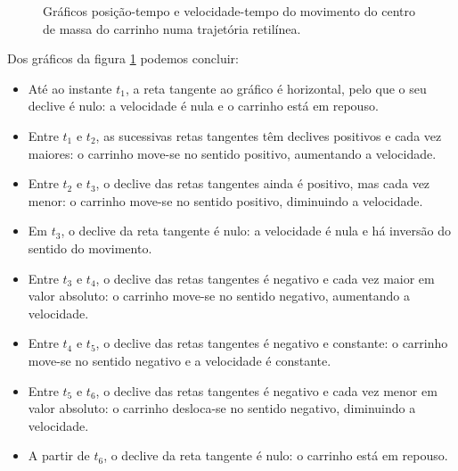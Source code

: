 \documentclass[a4paper,12pt]{article}
\begin{document}
\begin{figure}[H]
		\caption{Gráficos posição-tempo e velocidade-tempo do movimento do centro de massa do carrinho numa trajetória retilínea.}
		\label{fig:grafv1}
	\end{figure}
	
	Dos gráficos da figura \ref{fig:grafv1} podemos concluir:
	\begin{itemize}
		\item Até ao instante $t_1$, a reta tangente ao gráfico é horizontal, pelo que o seu declive é nulo: a velocidade é nula e o carrinho está em repouso.
		\item Entre $t_1$ e $t_2$, as sucessivas retas tangentes têm declives positivos e cada vez maiores: o carrinho move-se no sentido positivo, aumentando a  velocidade.
		\item Entre $t_2$ e $t_3$, o declive das retas tangentes ainda é positivo, mas cada vez menor: o carrinho move-se no sentido positivo, diminuindo a velocidade.
		\item Em $t_3$, o declive da reta tangente é nulo: a velocidade é nula e há inversão do sentido do movimento.
		\item Entre $t_3$ e $t_4$, o declive das retas tangentes é negativo e cada vez maior em valor absoluto: o carrinho move-se no sentido negativo, aumentando a velocidade.
		\item Entre $t_4$ e $t_5$, o declive das retas tangentes é negativo e constante: o carrinho move-se no sentido negativo e a velocidade é constante.
		\item Entre $t_5$ e $t_6$, o declive das retas tangentes é negativo e cada vez menor em valor absoluto: o carrinho desloca-se no sentido negativo, diminuindo a velocidade.
		\item A partir de $t_6$, o declive da reta tangente é nulo: o carrinho está em repouso.
	\end{itemize}
	
\end{document}
